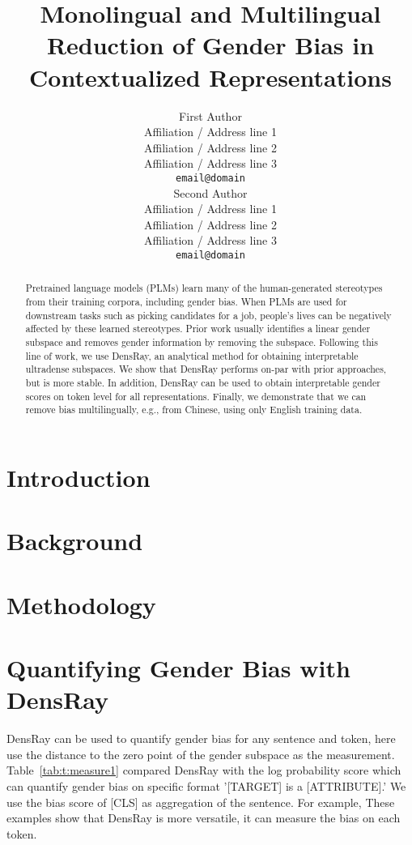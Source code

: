 \documentclass[11pt,a4paper]{article}
\title{Monolingual and Multilingual Reduction of Gender Bias in Contextualized Representations}
\author{First Author \\
  Affiliation / Address line 1 \\
  Affiliation / Address line 2 \\
  Affiliation / Address line 3 \\
  \texttt{email@domain} \\\And
  Second Author \\
  Affiliation / Address line 1 \\
  Affiliation / Address line 2 \\
  Affiliation / Address line 3 \\
  \texttt{email@domain} \\}
\date{}
\def\tabref#1{Table~\ref{tab:#1}}
\begin{document}
\maketitle

\begin{abstract}

Pretrained language models (PLMs) learn many of the
human-generated stereotypes from their training corpora,
including gender bias.  When PLMs are used for downstream
tasks such as picking candidates for a job, people's lives
can be negatively affected by these learned stereotypes.
Prior work usually identifies a linear gender subspace and
removes gender information by removing the
subspace. Following this line of work, we use DensRay, an
analytical method for obtaining interpretable ultradense
subspaces. We show that DensRay performs on-par with prior
approaches, but is more stable. In addition, DensRay can be
used to obtain interpretable gender scores on token level
for all representations.  Finally, we demonstrate that we
can remove bias multilingually, e.g., from Chinese, using
only English training data.

\end{abstract}

\section{Introduction}


\section{Background}


\section{Methodology}


\section{Quantifying Gender Bias with DensRay}
DensRay can be used to quantify gender bias for any sentence and token, here use the distance to the zero point of the gender subspace as the measurement. \tabref{t:measure1} compared DensRay with the log probability score \citep{kurita2019measuring} which can quantify gender bias on specific format '[TARGET] is a [ATTRIBUTE].' We use the bias score of [CLS] as aggregation of the sentence. For example, These examples show that DensRay is more versatile, it can measure the bias on each token.
\end{document}
